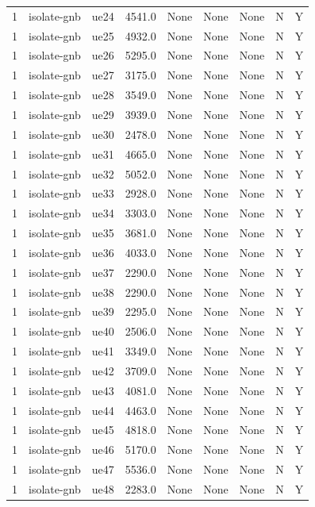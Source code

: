\begin{table}[ht]
\begin{tabular}{|c|c|c|c|c|c|c|c|c|}
1 & isolate-gnb & ue24 & 4541.0 & None & None & None & N & Y \\
1 & isolate-gnb & ue25 & 4932.0 & None & None & None & N & Y \\
1 & isolate-gnb & ue26 & 5295.0 & None & None & None & N & Y \\
1 & isolate-gnb & ue27 & 3175.0 & None & None & None & N & Y \\
1 & isolate-gnb & ue28 & 3549.0 & None & None & None & N & Y \\
1 & isolate-gnb & ue29 & 3939.0 & None & None & None & N & Y \\
1 & isolate-gnb & ue30 & 2478.0 & None & None & None & N & Y \\
1 & isolate-gnb & ue31 & 4665.0 & None & None & None & N & Y \\
1 & isolate-gnb & ue32 & 5052.0 & None & None & None & N & Y \\
1 & isolate-gnb & ue33 & 2928.0 & None & None & None & N & Y \\
1 & isolate-gnb & ue34 & 3303.0 & None & None & None & N & Y \\
1 & isolate-gnb & ue35 & 3681.0 & None & None & None & N & Y \\
1 & isolate-gnb & ue36 & 4033.0 & None & None & None & N & Y \\
1 & isolate-gnb & ue37 & 2290.0 & None & None & None & N & Y \\
1 & isolate-gnb & ue38 & 2290.0 & None & None & None & N & Y \\
1 & isolate-gnb & ue39 & 2295.0 & None & None & None & N & Y \\
1 & isolate-gnb & ue40 & 2506.0 & None & None & None & N & Y \\
1 & isolate-gnb & ue41 & 3349.0 & None & None & None & N & Y \\
1 & isolate-gnb & ue42 & 3709.0 & None & None & None & N & Y \\
1 & isolate-gnb & ue43 & 4081.0 & None & None & None & N & Y \\
1 & isolate-gnb & ue44 & 4463.0 & None & None & None & N & Y \\
1 & isolate-gnb & ue45 & 4818.0 & None & None & None & N & Y \\
1 & isolate-gnb & ue46 & 5170.0 & None & None & None & N & Y \\
1 & isolate-gnb & ue47 & 5536.0 & None & None & None & N & Y \\
1 & isolate-gnb & ue48 & 2283.0 & None & None & None & N & Y \\

\end{tabular}
\end{table}
